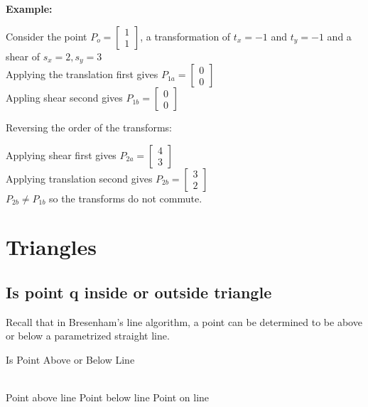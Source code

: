 \documentclass[a4paper,10pt]{scrartcl}
\begin{document}
{\bfseries{Example:}}

Consider the point $P_o = \begin{bmatrix} 1 \\ 1 \end{bmatrix}$, a transformation of $t_x = -1$ and $t_y = -1$ and a shear of $s_x = 2, s_y = 3$\\
Applying the translation first gives $P_{1a} = \begin{bmatrix} 0 \\ 0 \end{bmatrix}$ \\ 
Appling shear second gives $P_{1b} = \begin{bmatrix} 0 \\ 0 \end{bmatrix}$

Reversing the order of the transforms:

Applying shear first gives $P_{2a} = \begin{bmatrix} 4 \\ 3 \end{bmatrix}$ \\
Applying translation second gives  $P_{2b} = \begin{bmatrix} 3 \\ 2 \end{bmatrix}$ \\

$P_{2b} \neq P_{1b}$ so the transforms do not commute.

\section{Triangles}

\subsection{Is point q inside or outside triangle}

Recall that in Bresenham's line algorithm, a point can be determined to be above or below a parametrized straight line.

\begin{algorithm}[h!]
  \caption{Is Point Above or Below Line}\label{}
  
  \begin{algorithmic}
    \\
    \State Point above line
    \State   Point below line
    \Else 
    \State Point on line
    \EndIf\\
    \EndFunction
    
  \end{algorithmic}
\end{algorithm}
\end{document}

